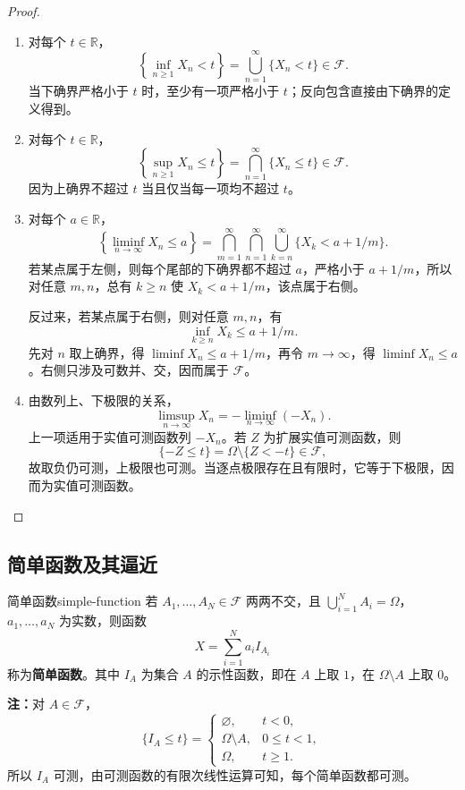 \begin{proof}
\begin{enumerate}
\item 对每个 $t\in\mathbb R$，
\[
\left\{\inf_{n\geq1}X_n<t\right\}
=\bigcup_{n=1}^{\infty}\{X_n<t\}\in\mathcal F.
\]
当下确界严格小于 $t$ 时，至少有一项严格小于 $t$；反向包含直接由下确界的定义得到。
\item 对每个 $t\in\mathbb R$，
\[
\left\{\sup_{n\geq1}X_n\leq t\right\}
=\bigcap_{n=1}^{\infty}\{X_n\leq t\}\in\mathcal F.
\]
因为上确界不超过 $t$ 当且仅当每一项均不超过 $t$。
\item 对每个 $a\in\mathbb R$，
\[
\left\{\liminf_{n\to\infty}X_n\leq a\right\}
=\bigcap_{m=1}^{\infty}\bigcap_{n=1}^{\infty}
 \bigcup_{k=n}^{\infty}\{X_k<a+1/m\}.
\]
若某点属于左侧，则每个尾部的下确界都不超过 $a$，严格小于 $a+1/m$，所以对任意 $m,n$，总有 $k\geq n$ 使 $X_k<a+1/m$，该点属于右侧。

反过来，若某点属于右侧，则对任意 $m,n$，有
\[
\inf_{k\geq n}X_k\leq a+1/m.
\]
先对 $n$ 取上确界，得 $\liminf X_n\leq a+1/m$，再令 $m\to\infty$，得 $\liminf X_n\leq a$。右侧只涉及可数并、交，因而属于 $\mathcal F$。
\item 由数列上、下极限的关系，
\[
\limsup_{n\to\infty}X_n=-\liminf_{n\to\infty}(-X_n).
\]
上一项适用于实值可测函数列 $-X_n$。若 $Z$ 为扩展实值可测函数，则
\[
\{-Z\leq t\}=\Omega\setminus\{Z<-t\}\in\mathcal F,
\]
故取负仍可测，上极限也可测。当逐点极限存在且有限时，它等于下极限，因而为实值可测函数。
\end{enumerate}
\end{proof}

\subsection*{简单函数及其逼近}

\begin{mydefinition}{简单函数}{simple-function}
若 $A_1,\ldots,A_N\in\mathcal F$ 两两不交，且 $\bigcup_{i=1}^N A_i=\Omega$，$a_1,\ldots,a_N$ 为实数，则函数
\[
X=\sum_{i=1}^N a_i I_{A_i}
\]
称为\textbf{简单函数}。其中 $I_A$ 为集合 $A$ 的示性函数，即在 $A$ 上取 $1$，在 $\Omega\setminus A$ 上取 $0$。
\end{mydefinition}

\textbf{注：}\quad 对 $A\in\mathcal F$，
\[
\{I_A\leq t\}=
\begin{cases}
\varnothing,&t<0,\\
\Omega\setminus A,&0\leq t<1,\\
\Omega,&t\geq1.
\end{cases}
\]
所以 $I_A$ 可测，由可测函数的有限次线性运算可知，每个简单函数都可测。

